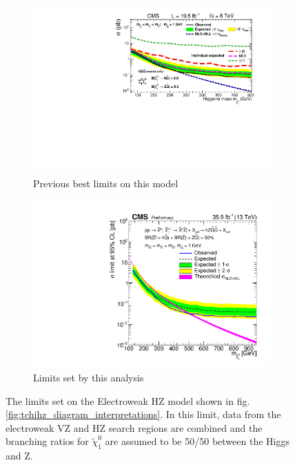     \begin{figure}[!h]
      \centering
        \begin{subfigure}[b]{0.4\textwidth}
          \label{fig:t5zz_interpretations_2015}
          \includegraphics[width=\textwidth]{figures/interpretations/TChiHZ_previous_best.pdf}
          \caption{Previous best limits on this model}
        \end{subfigure}
        \begin{subfigure}[b]{0.4\textwidth}
          \label{fig:t5zz_interpretations_current}
          \includegraphics[width=\textwidth]{figures/interpretations/TChiHZ_0p25ZZ_Exclusion_13TeV.pdf}
          \caption{Limits set by this analysis}
        \end{subfigure}
      \caption[The limits set on the Electroweak HZ model.]{ \label{fig:tchihz_interpretation}
        The limits set on the Electroweak HZ model shown in fig. \ref{fig:tchihz_diagram_interpretations}. In this limit, data from the electroweak VZ and HZ search regions are combined and the branching ratios for $\widetilde{\chi}^0_1$ are assumed to be 50/50 between the Higgs and Z.
      }
    \end{figure}

